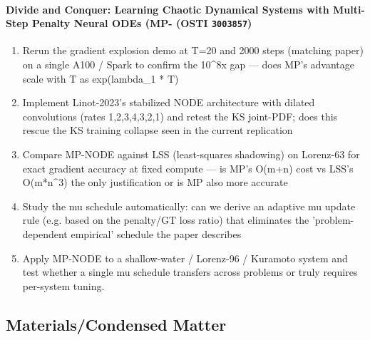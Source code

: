 \documentclass[11pt]{article}
\begin{document}
\paragraph{Divide and Conquer: Learning Chaotic Dynamical Systems with Multi-Step Penalty Neural ODEs (MP- \textnormal{\small(OSTI \texttt{3003857})}}
\begin{enumerate}[leftmargin=1.6em,itemsep=0.2em,topsep=0.2em,label=Q\arabic*.]
\item Rerun the gradient explosion demo at T=20 and 2000 steps (matching paper) on a single A100 / Spark to confirm the 10\textasciicircum{}8x gap --- does MP's advantage scale with T as exp(lambda\_1 * T)
\item Implement Linot-2023's stabilized NODE architecture with dilated convolutions (rates 1,2,3,4,3,2,1) and retest the KS joint-PDF; does this rescue the KS training collapse seen in the current replication
\item Compare MP-NODE against LSS (least-squares shadowing) on Lorenz-63 for exact gradient accuracy at fixed compute --- is MP's O(m+n) cost vs LSS's O(m*n\textasciicircum{}3) the only justification or is MP also more accurate
\item Study the mu schedule automatically: can we derive an adaptive mu update rule (e.g. based on the penalty/GT loss ratio) that eliminates the 'problem-dependent empirical' schedule the paper describes
\item Apply MP-NODE to a shallow-water / Lorenz-96 / Kuramoto system and test whether a single mu schedule transfers across problems or truly requires per-system tuning.
\end{enumerate}
\subsection*{Materials/Condensed Matter}
\end{document}
